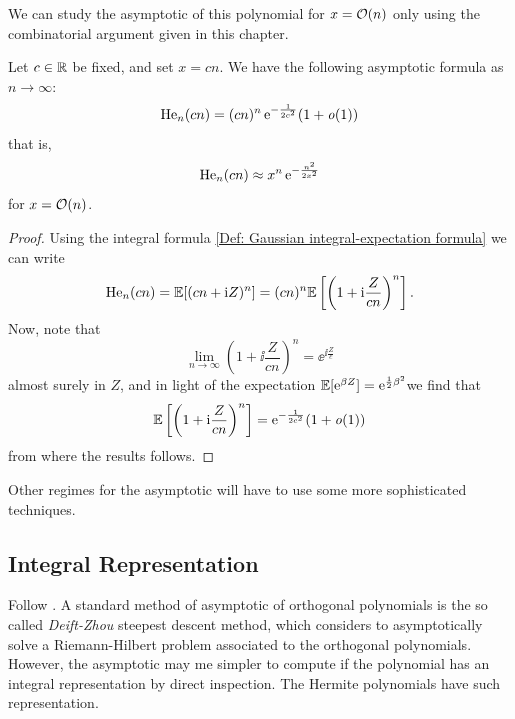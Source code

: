 We can study the asymptotic of this polynomial for $x = \mathcal{O}(n)$ only using the combinatorial argument given in this chapter.

\begin{prop}
	Let $c \in \mathbb{R}$ be fixed, and set $x = c n$. We have the following asymptotic formula as $n \rightarrow \infty$:
	\begin{equation}
		\mathrm{He}_n(cn) = (cn)^n \operatorname{e}^{-\frac{1}{2c^2}} (1 + \mathit{o}(1))
	\end{equation}
	that is,
	\begin{equation}
		\mathrm{He}_n(cn) \approx x^n \operatorname{e}^{-\frac{n^2}{2x^2}}
	\end{equation}
	for $x = \mathcal{O}(n)$.
	\label{Prop: Hermite Asymptotic o(n)}
\end{prop}
\begin{proof}
	Using the integral formula \ref{Def: Gaussian integral-expectation formula} we can write
	\begin{equation}
		\mathrm{He}_n(cn) = \mathbb{E}[(cn + \mathrm{i} Z)^n] = (cn)^n \mathbb{E}\left[\left(1 + \mathrm{i}\frac{Z}{cn} \right)^n \right].
	\end{equation}
	Now, note that 
	\begin{equation}
		\lim_{n\rightarrow \infty} \left(1 + \ii\frac{Z}{cn} \right)^n = \ee^{\ii \frac{Z}{c}}
	\end{equation}
	almost surely in $Z$, and in light of the expectation $\mathbb{E}[\operatorname{e}^{\beta Z}] = \operatorname{e}^{\frac{1}{2} \beta^2}$we find that 
	\begin{equation}
		\mathbb{E}\left[\left(1 + \mathrm{i}\frac{Z}{cn} \right)^n \right] = \operatorname{e}^{-\frac{1}{2c^2}}(1+ \mathit{o}(1))
	\end{equation}
	from where the results follows.
\end{proof}

Other regimes for the asymptotic will have to use some more sophisticated techniques.

\subsection{Integral Representation}
\label{Subsection: Integral Hermite}


Follow \cite[Proposition 2.1]{Zhipeng-Liu-ClassNotes}. A standard method of asymptotic of orthogonal polynomials is the so called \textit{Deift-Zhou} steepest descent method, which considers to asymptotically solve a Riemann-Hilbert problem associated to the orthogonal polynomials. However, the asymptotic may me simpler to compute if the polynomial has an integral representation by direct inspection. The Hermite polynomials have such representation.

